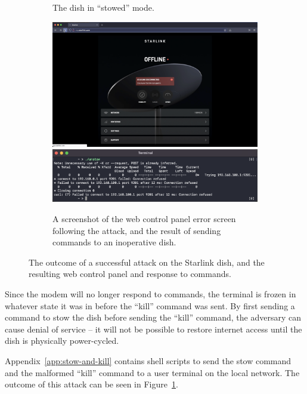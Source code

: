 \begin{figure}
\begin{subfigure}{.23235\textwidth}
        \caption{The dish in ``stowed'' mode.\vspace{1em}}
    \end{subfigure}
    \begin{subfigure}{.55\textwidth}
        \centering\includegraphics[width=\textwidth]{img/offline.png}\\\vspace{.35em}
        \centering\includegraphics[width=\textwidth]{img/unstow.png}
        \caption{A screenshot of the web control panel error screen following the attack, and the result of sending commands to an inoperative dish.}
    \end{subfigure}
\caption{The outcome of a successful attack on the Starlink dish, and the resulting web control panel and response to commands.}
\label{fig:attack-outcome}
\end{figure}

Since the modem will no longer respond to commands, the terminal is frozen in whatever state it was in before the ``kill'' command was sent.
By first sending a command to stow the dish before sending the ``kill'' command, the adversary can cause denial of service -- it will not be possible to restore internet access until the dish is physically power-cycled.

Appendix~\ref{app:stow-and-kill} contains shell scripts to send the stow command and the malformed ``kill'' command to a user terminal on the local network.
The outcome of this attack can be seen in Figure~\ref{fig:attack-outcome}.